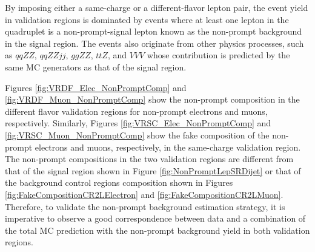 By imposing either a same-charge or a different-flavor lepton pair, the event yield in validation regions is dominated by events where at least one lepton in the quadruplet is a non-prompt-signal lepton known as the non-prompt background in the signal region. The events also originate from other physics processes, such as $qqZZ$, $qqZZjj$, $ggZZ$, $ttZ$, and $VVV$ whose contribution is predicted by the same MC generators as that of the signal region.

Figures \ref{fig:VRDF_Elec_NonPromptComp} and \ref{fig:VRDF_Muon_NonPromptComp} show the non-prompt composition in the different flavor validation regions for non-prompt electrons and muons, respectively. Similarly, Figures \ref{fig:VRSC_Elec_NonPromptComp} and \ref{fig:VRSC_Muon_NonPromptComp} show the fake composition of the non-prompt electrons and muons, respectively, in the same-charge validation region. The non-prompt compositions in the two validation regions are different from that of the signal region shown in Figure \ref{fig:NonPromptLepSRDijet} or that of the background control regions composition shown in Figures \ref{fig:FakeCompositionCR2LElectron} and \ref{fig:FakeCompositionCR2LMuon}. Therefore, to validate the non-prompt background estimation strategy, it is imperative to observe a good correspondence between data and a combination of the total MC prediction with the non-prompt background yield in both validation regions.

